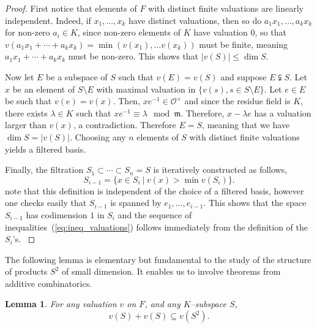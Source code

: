 \documentclass{article}
\theoremstyle{plain}
\newtheorem{lemma}[thm]{Lemma}
\theoremstyle{definition}
\theoremstyle{remark}
\def\OO{\mathcal{O}}
\def\m{\mathfrak m}
\renewcommand{\leq}{\leqslant}
\begin{document}
\begin{proof}
  First notice that elements of $F$ with distinct finite valuations are
  linearly independent.
  Indeed, if $x_1, \ldots, x_k$ have distinct valuations, then so do
  $a_1x_1,\ldots ,a_kx_k$ for non-zero $a_i\in K$, 
since non-zero elements of $K$ have valuation $0$,
  so that $v(a_1 x_1 + \cdots + a_k x_k)=\min(v(x_1),\ldots v(x_k))$
  must be finite, meaning 
  $a_1 x_1 + \cdots + a_k x_k$ must be non-zero.
   This shows that $|v(S)| \leq \dim S$.
   
  Now let $E$ be a subspace of $S$ such that $v(E)=v(S)$ and suppose
  $E\subsetneqq S$. Let $x$ be an element of $S\setminus E$ with
  maximal valuation in $\{v(s), s\in S\setminus E\}$. Let $e\in E$ be
  such that $v(e)=v(x)$.  Then, $xe^{-1} \in \OO^\times$
  and since the residue field is $K$, there exists $\lambda \in K$
  such that $xe^{-1} \equiv \lambda \mod \m$. Therefore, 
  $x  -\lambda e$ has a valuation larger than $v(x)$, a
  contradiction. Therefore $E=S$, meaning that we have $\dim
  S=|v(S)|$. Choosing any $n$ elements of $S$ with distinct finite
  valuations yields a filtered basis.

  {
  Finally, the filtration $S_1 \subset \cdots \subset S_n = S$ is iteratively constructed as follows,
  $$
  S_{i-1} = \{x \in S_i ~|~ v(x) > \min v(S_i)\}.
  $$
note that this definition is independent of the choice of a filtered
basis, however one checks easily that $S_{i-1}$ is spanned by $e_1, \ldots, e_{i-1}$.
  This shows that the space $S_{i-1}$ has codimension $1$ in $S_i$ and the sequence 
  of inequalities~(\ref{eq:ineq_valuations}) follows immediately from the definition of the $S_i$'s.
  }
\end{proof}

The following lemma is elementary but fundamental to the study of
the structure of products $S^2$ of small dimension.
It enables us to involve theorems from additive combinatorics.

\begin{lemma}\label{lem:v(H^2)}
For any valuation $v$ on $F$, and any $K$--subspace $S$,
\begin{equation}\label{eq:valuation_product}
v(S)+v(S) \subseteq v(S^2).
\end{equation}  
\end{lemma}
\end{document}
